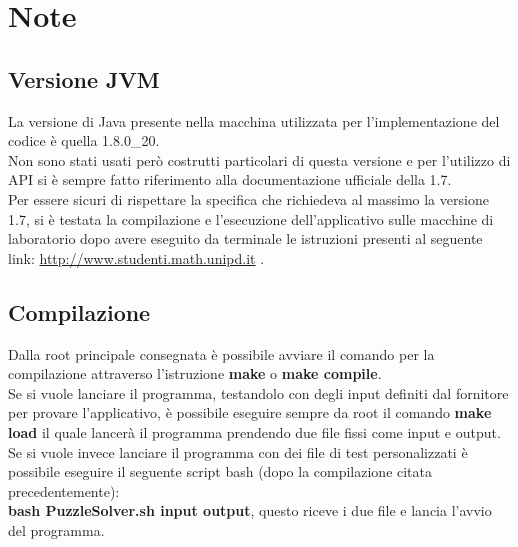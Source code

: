 % 
%
% 
%

\section{Note}
	\subsection{Versione JVM}
La versione di Java presente nella macchina utilizzata per l'implementazione del codice è quella 1.8.0\_20. \\
Non sono stati usati però costrutti particolari di questa versione e per l'utilizzo di API si è sempre fatto riferimento alla documentazione ufficiale della 1.7. \\
Per essere sicuri di rispettare la specifica che richiedeva al massimo la versione 1.7, si è testata la compilazione e l'esecuzione dell'applicativo sulle macchine di laboratorio dopo avere eseguito da terminale le istruzioni presenti al seguente link: \href{http://www.studenti.math.unipd.it/index.php?id=corsi#c620}{http://www.studenti.math.unipd.it} .

	\subsection{Compilazione}
Dalla root principale consegnata è possibile avviare il comando per la compilazione attraverso l'istruzione \textbf{make} o \textbf{make compile}. \\
Se si vuole lanciare il programma, testandolo con degli input definiti dal fornitore per provare l'applicativo, è possibile eseguire sempre da root il comando \textbf{make load} il quale lancerà il programma prendendo due file fissi come input e output. \\
Se si vuole invece lanciare il programma con dei file di test personalizzati è possibile eseguire il seguente script bash (dopo la compilazione citata precedentemente): \\
\textbf{bash PuzzleSolver.sh input output}, questo riceve i due file e lancia l'avvio del programma.

